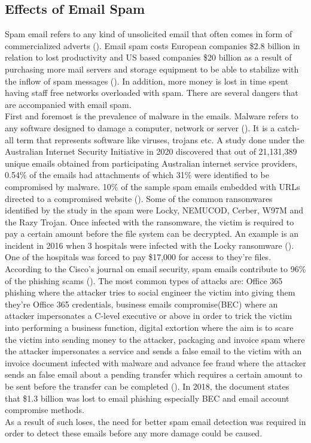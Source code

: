 \subsection{Effects of Email Spam}
Spam email refers to any kind of unsolicited email that often comes in form of commercialized adverts (\cite{spam_jiss}). Email spam costs European companies \$2.8 billion in relation to lost productivity and US based companies \$20 billion as a result of purchasing more mail servers and storage equipment to be able to stabilize with the inflow of spam messages (\cite{spam_jiss}). In addition, more money is lost in time spent having staff free networks overloaded with spam. There are several dangers that are accompanied with email spam.\\
First and foremost is the prevalence of malware in the emails. Malware refers to any software designed to damage a computer, network or server (\cite{moir_2009}). It is a catch-all term that represents software like viruses, trojans etc. A study done under the Australian Internet Security Initiative in 2020 discovered that out of 21,131,389 unique emails obtained from participating Australian internet service providers, 0.54\% of the emails had attachments of which 31\% were identified to be compromised by malware. 10\% of the sample spam emails embedded with URLs directed to a compromised website (\cite{soam_malware}). Some of the common ransomwares identified by the study in the spam were Locky, NEMUCOD, Cerber, W97M and the Razy Trojan. Once infected with the ransomware, the victim is required to pay a certain amount before the file system can be decrypted. An example is an incident in 2016 when 3 hospitals were infected with the Locky ransomware (\cite{bbc_2016}). One of the hospitals was forced to pay \$17,000 for access to they're files.\\
According to the Cisco's journal on email security, spam emails contribute to 96\% of the phishing scams (\cite{cisco_2019}). The most common types of attacks are: Office 365 phishing where the attacker tries to social engineer the victim into giving them they're Office 365 credentials, business emails compromise(BEC) where an attacker impersonates a C-level executive or above in order to trick the victim into performing a business function, digital extortion where the aim is to scare the victim into sending money to the attacker, packaging and invoice spam where the attacker impersonates a service and sends a false email to the victim with an invoice document infected with malware and advance fee fraud where the attacker sends an false email about a pending transfer which requires a certain amount to be sent before the transfer can be completed (\cite{cisco_2019}). In 2018, the document states that \$1.3 billion was lost to email phishing especially BEC and email account compromise methods.
\\
As a result of such loses, the need for better spam email detection was required in order to detect these emails before any more damage could be caused.